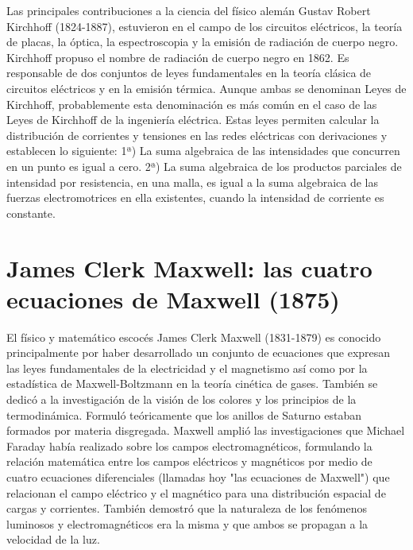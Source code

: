 \documentclass{article}
\begin{document}
Las principales contribuciones a la ciencia del físico alemán Gustav Robert Kirchhoff (1824-1887), estuvieron en el campo de los circuitos eléctricos, la teoría de placas, la óptica, la espectroscopia y la emisión de radiación de cuerpo negro. Kirchhoff propuso el nombre de radiación de cuerpo negro en 1862. Es responsable de dos conjuntos de leyes fundamentales en la teoría clásica de circuitos eléctricos y en la emisión térmica. Aunque ambas se denominan Leyes de Kirchhoff, probablemente esta denominación es más común en el caso de las Leyes de Kirchhoff de la ingeniería eléctrica. Estas leyes permiten calcular la distribución de corrientes y tensiones en las redes eléctricas con derivaciones y establecen lo siguiente: 1ª) La suma algebraica de las intensidades que concurren en un punto es igual a cero. 2ª) La suma algebraica de los productos parciales de intensidad por resistencia, en una malla, es igual a la suma algebraica de las fuerzas electromotrices en ella existentes, cuando la intensidad de corriente es constante. \citep{HDE}\\


\section{James Clerk Maxwell: las cuatro ecuaciones de Maxwell (1875)}

El físico y matemático escocés James Clerk Maxwell (1831-1879) es conocido principalmente por haber desarrollado un conjunto de ecuaciones que expresan las leyes fundamentales de la electricidad y el magnetismo así como por la estadística de Maxwell-Boltzmann en la teoría cinética de gases. También se dedicó a la investigación de la visión de los colores y los principios de la termodinámica. Formuló teóricamente que los anillos de Saturno estaban formados por materia disgregada. Maxwell amplió las investigaciones que Michael Faraday había realizado sobre los campos electromagnéticos, formulando la relación matemática entre los campos eléctricos y magnéticos por medio de cuatro ecuaciones diferenciales (llamadas hoy "las ecuaciones de Maxwell") que relacionan el campo eléctrico y el magnético para una distribución espacial de cargas y corrientes. También demostró que la naturaleza de los fenómenos luminosos y electromagnéticos era la misma y que ambos se propagan a la velocidad de la luz.\citep{HDE}\\ 
\end{document}
